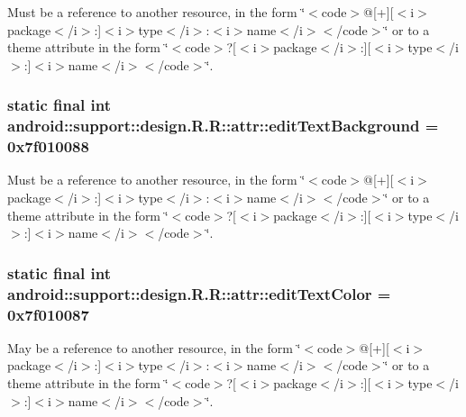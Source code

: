 Must be a reference to another resource, in the form \char`\"{}$<$code$>$@\mbox{[}+\mbox{]}\mbox{[}$<$i$>$package$<$/i$>$:\mbox{]}$<$i$>$type$<$/i$>$:$<$i$>$name$<$/i$>$$<$/code$>$\char`\"{} or to a theme attribute in the form \char`\"{}$<$code$>$?\mbox{[}$<$i$>$package$<$/i$>$:\mbox{]}\mbox{[}$<$i$>$type$<$/i$>$:\mbox{]}$<$i$>$name$<$/i$>$$<$/code$>$\char`\"{}. \hypertarget{classandroid_1_1support_1_1design_1_1_r_1_1attr_80efd1fb569b4e677ae04bb42e9f525c}{
\subsubsection[{editTextBackground}]{\setlength{\rightskip}{0pt plus 5cm}static final int android::support::design.R.R::attr::editTextBackground = 0x7f010088}}
\label{classandroid_1_1support_1_1design_1_1_r_1_1attr_80efd1fb569b4e677ae04bb42e9f525c}


Must be a reference to another resource, in the form \char`\"{}$<$code$>$@\mbox{[}+\mbox{]}\mbox{[}$<$i$>$package$<$/i$>$:\mbox{]}$<$i$>$type$<$/i$>$:$<$i$>$name$<$/i$>$$<$/code$>$\char`\"{} or to a theme attribute in the form \char`\"{}$<$code$>$?\mbox{[}$<$i$>$package$<$/i$>$:\mbox{]}\mbox{[}$<$i$>$type$<$/i$>$:\mbox{]}$<$i$>$name$<$/i$>$$<$/code$>$\char`\"{}. \hypertarget{classandroid_1_1support_1_1design_1_1_r_1_1attr_2eae6a8c42cde05279f5d86603198138}{
\subsubsection[{editTextColor}]{\setlength{\rightskip}{0pt plus 5cm}static final int android::support::design.R.R::attr::editTextColor = 0x7f010087}}
\label{classandroid_1_1support_1_1design_1_1_r_1_1attr_2eae6a8c42cde05279f5d86603198138}


May be a reference to another resource, in the form \char`\"{}$<$code$>$@\mbox{[}+\mbox{]}\mbox{[}$<$i$>$package$<$/i$>$:\mbox{]}$<$i$>$type$<$/i$>$:$<$i$>$name$<$/i$>$$<$/code$>$\char`\"{} or to a theme attribute in the form \char`\"{}$<$code$>$?\mbox{[}$<$i$>$package$<$/i$>$:\mbox{]}\mbox{[}$<$i$>$type$<$/i$>$:\mbox{]}$<$i$>$name$<$/i$>$$<$/code$>$\char`\"{}. 

